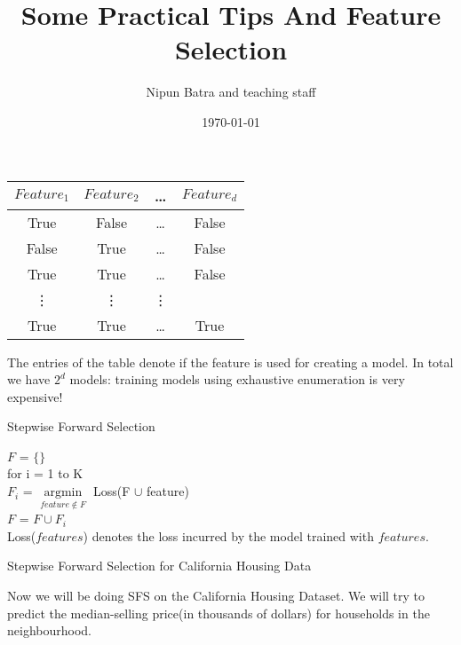\documentclass{beamer}
\title{Some Practical Tips And Feature Selection}
\date{\today}
\author{Nipun Batra and teaching staff}
\institute{IIT Gandhinagar}
\newcommand{\argminF}{\mathop{\mathrm{argmin}}\limits}   %
\begin{document}
  \maketitle


\begin{frame}\begin{tabular}{c|c|c|c}
        $Feature_{1}$ & $Feature_{2}$ &\dots & $Feature_{d}$  \\
        \hline
      
         True  & False &  \dots & False\\
         False &  True & \dots & False\\ 
         True &  True & \dots & False\\ 
         \vdots &  \vdots & \vdots&\\
         True & True &\dots & True\\ 
         \hline 
         
    \end{tabular}
    
    \pause The entries of the table denote if the feature is used for creating a model. In total we have $2^{d}$ models: training models using exhaustive enumeration is very expensive!
\end{frame}

\begin{frame}{Stepwise Forward Selection}

    $F$ = $\{\}$\\
    for i = 1 to K\\
    \vspace{1em}
    \hspace{2em} $F_{i}$  = $\argminF_{feature \notin F} $ Loss(F $\cup$ feature)\\
    \vspace{1em}
    \hspace{2em} $F$ = $F \cup F_{i}$ \\
        
\vspace{2em}
Loss($features$) denotes the loss incurred by the model trained with $features$.
\end{frame}

\begin{frame}{Stepwise Forward Selection for California Housing Data }

	Now we will be doing SFS on the California Housing Dataset. We will try to predict the median-selling price(in thousands of dollars) for households in the neighbourhood.
	
\end{frame}
\end{document}
